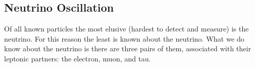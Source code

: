 

\subsection{Neutrino Oscillation}

Of all known particles the most elusive (hardest to detect and measure) is the neutrino.
For this reason the least is known about the neutrino.
What we do know about the neutrino is there are three pairs of them, associated with their leptonic partners: the electron, muon, and tau.

